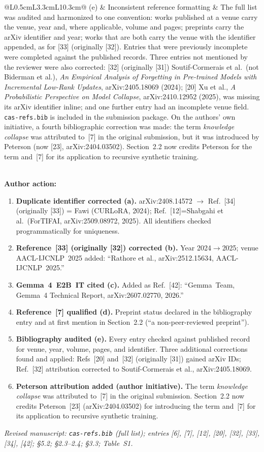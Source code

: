 \documentclass[11pt,a4paper]{article}
\newcommand{\arhead}[1]{\medskip\noindent\textbf{#1}\par\smallskip}
\newcommand{\newtext}[1]{\textcolor{chgcolor}{``#1''}}
\newcommand{\msloc}[1]{%
  \smallskip\noindent\textit{Revised manuscript: #1}\par%
}
\begin{document}
\begin{longtable}{@{}L{0.5cm}L{3.3cm}L{10.3cm}@{}}
(e) & Inconsistent reference formatting &
The full list was audited and harmonized to one convention: works
published at a venue carry the venue, year and, where applicable, volume
and pages; preprints carry the arXiv identifier and year; works that are
both carry the venue with the identifier appended, as for [33] (originally [32]). Entries
that were previously incomplete were completed against the published
records. Three entries not mentioned by the reviewer were also corrected:
[32] (originally [31]) Soutif-Cormerais et al.\ (not Biderman et al.), \emph{An Empirical
Analysis of Forgetting in Pre-trained Models with Incremental Low-Rank
Updates}, arXiv:2405.18069 (2024); [20] Xu et al., \emph{A Probabilistic
Perspective on Model Collapse}, arXiv:2410.12952 (2025), was missing its
arXiv identifier inline; and one further entry had an incomplete venue
field. \texttt{cas-refs.bib} is included in the submission package.
On the authors' own initiative, a fourth bibliographic correction was
made: the term \emph{knowledge collapse} was attributed to~[7] in the
original submission, but it was introduced by Peterson (now [23],
arXiv:2404.03502). Section~2.2 now credits Peterson for the term
and~[7] for its application to recursive synthetic training. \\\
\end{longtable}

\arhead{Author action:}
\begin{enumerate}[leftmargin=1.4em,itemsep=0.3em]
\item \textbf{Duplicate identifier corrected (a).}
      arXiv:2408.14572 $\to$ Ref.~[34] (originally [33]) = Fawi (CURLoRA, 2024);
      Ref.~[12]=Shabgahi et al.\ (ForTIFAI, arXiv:2509.08972, 2025).
      All identifiers checked programmatically for uniqueness.
\item \textbf{Reference~[33] (originally [32]) corrected (b).}
      Year 2024$\to$2025; venue AACL-IJCNLP~2025 added:
      \newtext{Rathore et al., arXiv:2512.15634, AACL-IJCNLP~2025.}
\item \textbf{Gemma~4~E2B~IT cited (c).}
      Added as Ref.~[42]: \newtext{Gemma~Team, Gemma~4 Technical
      Report, arXiv:2607.02770, 2026.}
\item \textbf{Reference~[7] qualified (d).}
      Preprint status declared in the bibliography entry and at first
      mention in Section~2.2 (\newtext{a non-peer-reviewed preprint}).
\item \textbf{Bibliography audited (e).}
      Every entry checked against published record for venue, year,
      volume, pages, and identifier. Three additional corrections found
      and applied: Refs~[20] and~[32] (originally [31]) gained arXiv IDs; Ref.~[32]
      attribution corrected to Soutif-Cormerais et al., arXiv:2405.18069.
\item \textbf{Peterson attribution added (author initiative).}
      The term \emph{knowledge collapse} was attributed to~[7] in the
      original submission. Section~2.2 now credits Peterson~[23]
      (arXiv:2404.03502) for introducing the term and~[7] for its
      application to recursive synthetic training.
\end{enumerate}

\msloc{\texttt{cas-refs.bib} (full list); entries [6], [7], [12], [20], [32], [33], [34], [42]; \S5.2; \S2.3--2.4; \S3.3; Table~S1.}
\end{document}
